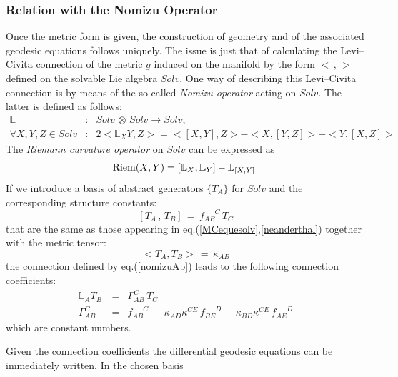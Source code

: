 \documentclass[10pt,a4paper]{article}
\def\Riem{\mathop{\rm Riem}\nolimits}
\begin{document}
\subsubsection{Relation with the Nomizu Operator}
\label{numiziato}
\par
Once the metric form is given, the construction of geometry and of
the associated geodesic equations follows uniquely. The issue is
just that of calculating the Levi--Civita connection of the metric
$g$ induced on the manifold by the form $< \, ,\, >$ defined on
the solvable Lie algebra $Solv$. One way of describing this Levi--Civita
connection is by means of the so called \textit{Nomizu operator}
acting on  $Solv$. The latter is defined as follows:
\begin{eqnarray}\label{nomizuAb}
 \mathbb{L}& : & Solv \, \otimes\,
Solv \rightarrow  Solv, \\
 \forall X, Y, Z \in
Solv & : & 2<\mathbb{L}_XY,Z> = <[X,Y],Z> - <X,[Y,Z]> - <Y,[X,Z]>\nonumber
\end{eqnarray}
The \textit{Riemann curvature operator} on $Solv$ can be expressed as
\begin{equation} \Riem(X,Y) =
[\mathbb{L}_X,\mathbb{L}_Y] - \mathbb{L}_{[X,Y]}~
\end{equation}
If we introduce a basis of abstract generators $\{T_A\}$ for $Solv$
and the corresponding structure constants:
\begin{equation}\label{strutteconste}
    \left [ T_A \, , \, T_B \right ] \, = \, f_{AB}^{\phantom{AB}C} \, T_C
\end{equation}
that are the same as those appearing in eq.(\ref{MCequesolv},\ref{neanderthal}) together with the metric tensor:
\begin{equation}\label{Gciccius}
    < T_A ,T_B> \, = \, \kappa_{AB}
\end{equation}
the connection defined by eq.(\ref{nomizuAb}) leads to the following  connection coefficients:
\begin{eqnarray}
  \mathbb{L}_A T_B\, &=& \Gamma_{AB}^C \, T_C \nonumber\\
  \Gamma_{AB}^C &=&  f_{AB}^{\phantom{AB}C} \, - \, \kappa_{AD} \kappa^{CE}\, f_{BE}^{\phantom{AB}D}
  - \, \kappa_{BD} \kappa^{CE}\, f_{AE}^{\phantom{AB}D}
\end{eqnarray}
which are constant numbers.
\par
Given the connection coefficients the differential geodesic equations can be immediately written. In the chosen basis
\end{document}
